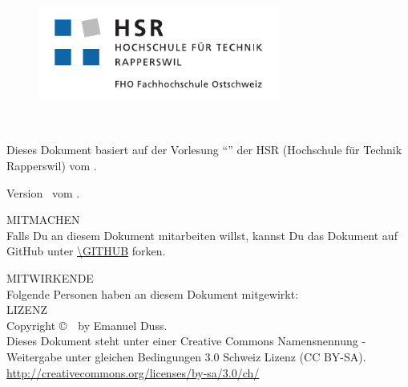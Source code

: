 %
%

\begin{titlepage}
  \maketitle
  \thispagestyle{empty}
  \vfill
  \begin{figure}[!htbp]
    \centering
    \includegraphics[width=300px]{hsr_logo.pdf}
  \end{figure}
\end{titlepage}

\thispagestyle{empty}
\SUBJECT \\
\TITLE

Dieses Dokument basiert auf der Vorlesung "`\TITLE"' der
HSR (Hochschule für Technik Rapperswil) vom \SEMESTER.

Version \REVISION~vom \REVISIONDATE.
\vfill

\uppercase{Mitmachen} \\
Falls Du an diesem Dokument mitarbeiten willst, kannst Du das Dokument
auf GitHub unter \url{\GITHUB} forken.

\uppercase{Mitwirkende} \\
Folgende Personen haben an diesem Dokument mitgewirkt: \\


\uppercase{Lizenz} \\
Copyright \copyright~\YEAR~by Emanuel Duss. \\
Dieses Dokument steht unter einer Creative Commons Namensnennung -
Weitergabe unter gleichen Bedingungen 3.0 Schweiz Lizenz (CC BY-SA). \\
\url{http://creativecommons.org/licenses/by-sa/3.0/ch/}

{\huge \ccbysa}

\tableofcontents
\setcounter{page}{1}

